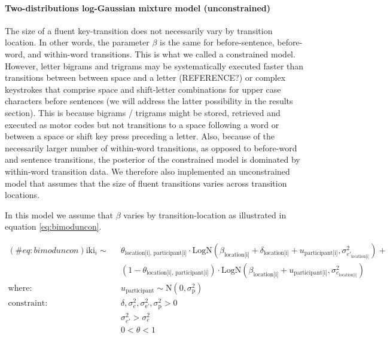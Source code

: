 \begin{appendix}
\hypertarget{two-distributions-log-gaussian-mixture-model-unconstrained}{%
\paragraph{Two-distributions log-Gaussian mixture model
(unconstrained)}\label{two-distributions-log-gaussian-mixture-model-unconstrained}}

The size of a fluent key-transition does not necessarily vary by
transition location. In other words, the parameter \(\beta\) is the same
for before-sentence, before-word, and within-word transitions. This is
what we called a constrained model. However, letter bigrams and trigrams
may be systematically executed faster than transitions between between
space and a letter (REFERENCE?) or complex keystrokes that comprise
space and shift-letter combinations for upper case characters before
sentences (we will address the latter possibility in the results
section). This is because bigrams / trigrams might be stored, retrieved
and executed as motor codes but not transitions to a space following a
word or between a space or shift key press preceding a letter. Also,
because of the necessarily larger number of within-word transitions, as
opposed to before-word and sentence transitions, the posterior of the
constrained model is dominated by within-word transition data. We
therefore also implemented an unconstrained model that assumes that the
size of fluent transitions varies across transition locations.

In this model we assume that \(\beta\) varies by transition-location as
illustrated in equation \ref{eq:bimoduncon}.

\begin{equation}
\begin{aligned}
(\#eq:bimoduncon)
\text{iki}_{i} \sim\text{ } & \theta_\text{location[i], participant[i]} \cdot \text{LogN}(\beta_\text{location[i]} + \delta_\text{location[i]} + u_\text{participant[i]}, \sigma_{e'_\text{location[i]}}^2) + \\
  & (1 - \theta_\text{location[i], participant[i]}) \cdot \text{LogN}(\beta_\text{location[i]} + u_\text{participant[i]}, \sigma_{e_\text{location[i]}}^2)\\
    \text{where: }  & u_\text{participant} \sim \text{N}(0, \sigma_\text{p}^2) \\
\text{constraint: } & \delta, \sigma_{e}^2, \sigma_\text{e'}^2, \sigma_\text{p}^2>0\\
        & \sigma_{e'}^2 > \sigma_{e}^2\\
        & 0 < \theta < 1
\end{aligned}
\end{equation}


\end{appendix}
